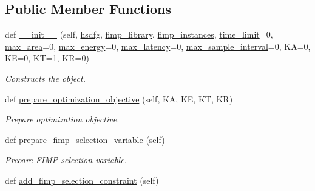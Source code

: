 \subsection*{Public Member Functions}
\begin{DoxyCompactItemize}
\item 
def \hyperlink{classsylva_1_1dse_1_1dse__engine_1_1_d_s_e_engine_ab4e96933ec1d0cf9225f8955bb8460f8}{\+\_\+\+\_\+init\+\_\+\+\_\+} (self, \hyperlink{classsylva_1_1dse_1_1dse__engine_1_1_d_s_e_engine_a932dc6f4a972c0189991f9d2ce842b5b}{hsdfg}, \hyperlink{classsylva_1_1dse_1_1dse__engine_1_1_d_s_e_engine_a50e3da63a9a4f7e4abb5ec09db297f88}{fimp\+\_\+library}, \hyperlink{classsylva_1_1dse_1_1dse__engine_1_1_d_s_e_engine_a99bcef7fbd55b0058ca934b0b3f8cb4c}{fimp\+\_\+instances}, \hyperlink{classsylva_1_1dse_1_1dse__engine_1_1_d_s_e_engine_a1520ce483781f1abea8275fb75bbc742}{time\+\_\+limit}=0, \hyperlink{classsylva_1_1dse_1_1dse__engine_1_1_d_s_e_engine_a3f8ec6d09b038af4fc1849d52945a618}{max\+\_\+area}=0, \hyperlink{classsylva_1_1dse_1_1dse__engine_1_1_d_s_e_engine_adc5adfdd271441b2d148ba4917a3a816}{max\+\_\+energy}=0, \hyperlink{classsylva_1_1dse_1_1dse__engine_1_1_d_s_e_engine_a9e3a420120dac809f071796af12ccab5}{max\+\_\+latency}=0, \hyperlink{classsylva_1_1dse_1_1dse__engine_1_1_d_s_e_engine_a8c3fe415b947865ef59fd5113031aa74}{max\+\_\+sample\+\_\+interval}=0, KA=0, KE=0, KT=1, KR=0)
\begin{DoxyCompactList}\small\item\em Constructs the object. \end{DoxyCompactList}\item 
def \hyperlink{classsylva_1_1dse_1_1dse__engine_1_1_d_s_e_engine_a81d7da304842f3b4ee2f109ce1b13a61}{prepare\+\_\+optimization\+\_\+objective} (self, KA, KE, KT, KR)
\begin{DoxyCompactList}\small\item\em Prepare optimization objective. \end{DoxyCompactList}\item 
def \hyperlink{classsylva_1_1dse_1_1dse__engine_1_1_d_s_e_engine_a8a603cdc4513668f3b96b07c19a57621}{prepare\+\_\+fimp\+\_\+selection\+\_\+variable} (self)
\begin{DoxyCompactList}\small\item\em Preoare F\+I\+MP selection variable. \end{DoxyCompactList}\item 
def \hyperlink{classsylva_1_1dse_1_1dse__engine_1_1_d_s_e_engine_a0da712297ca8f39a612f8c7daa8a98f7}{add\+\_\+fimp\+\_\+selection\+\_\+constraint} (self)

\end{DoxyCompactItemize}
